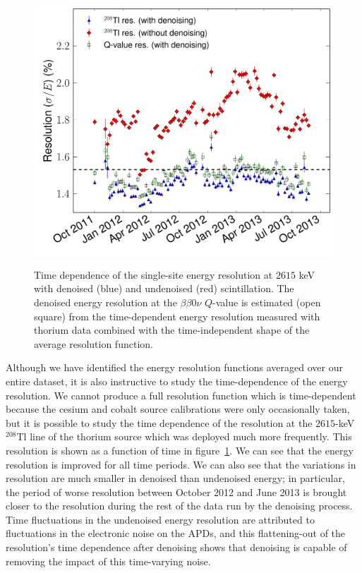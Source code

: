 \begin{figure}
\begin{center}
\includegraphics[keepaspectratio=true,width=\textwidth]{RotatedReso_denoised_compVsTime.pdf}
\end{center}
\renewcommand{\baselinestretch}{1}
\small\normalsize
\begin{quote}
\caption{Time dependence of the single-site energy resolution at $2615$ keV with denoised (blue) and undenoised (red) scintillation.  The denoised energy resolution at the $\beta\beta 0\nu$ $Q$-value is estimated (open square) from the time-dependent energy resolution measured with thorium data combined with the time-independent shape of the average resolution function.~\cite{NewEXObb0nPaper_2014}}
\label{fig:ResolutionTimeDependenceComparison}
\end{quote}
\end{figure}
\renewcommand{\baselinestretch}{2}
\small\normalsize

Although we have identified the energy resolution functions averaged over our entire dataset, it is also instructive to study the time-dependence of the energy resolution.  We cannot produce a full resolution function which is time-dependent because the cesium and cobalt source calibrations were only occasionally taken, but it is possible to study the time dependence of the resolution at the $2615$-keV $^{208}$Tl line of the thorium source which was deployed much more frequently.  This resolution is shown as a function of time in figure~\ref{fig:ResolutionTimeDependenceComparison}.  We can see that the energy resolution is improved for all time periods.  We can also see that the variations in resolution are much smaller in denoised than undenoised energy; in particular, the period of worse resolution between October 2012 and June 2013 is brought closer to the resolution during the rest of the data run by the denoising process.  Time fluctuations in the undenoised energy resolution are attributed to fluctuations in the electronic noise on the APDs, and this flattening-out of the resolution's time dependence after denoising shows that denoising is capable of removing the impact of this time-varying noise.~\cite{NewEXObb0nPaper_2014}

